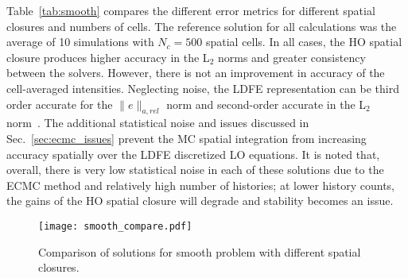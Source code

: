 Table~\ref{tab:smooth} compares the different error metrics for different spatial
closures and numbers of cells.  The reference solution for all calculations was the average of 10 simulations with $N_c=500$ spatial
cells.  In all cases, the HO spatial closure produces higher accuracy in the L$_2$
norms and greater consistency between the solvers.  However, there is not an
improvement in accuracy of the cell-averaged intensities.  Neglecting noise, the LDFE representation can be third order
accurate for the $\|e\|_{a,rel}$ norm and second-order accurate in the L$_2$ norm~\cite{morel_ldtrt}. 
The additional statistical noise and issues discussed in Sec.~\ref{sec:ecmc_issues}
prevent the MC spatial integration from increasing accuracy spatially over the LDFE discretized LO
equations.  It is noted that, overall, there is very low statistical noise in each of these
solutions due to the ECMC method and relatively high number of histories; at lower
history counts, the gains of the HO spatial closure will degrade and stability
becomes an issue.

\begin{figure}[H]
    \centering
    \texttt{[image: smooth\_compare.pdf]}
    \caption{\label{fig:smooth_compare} Comparison of solutions for smooth problem with different spatial closures.}
\end{figure}

